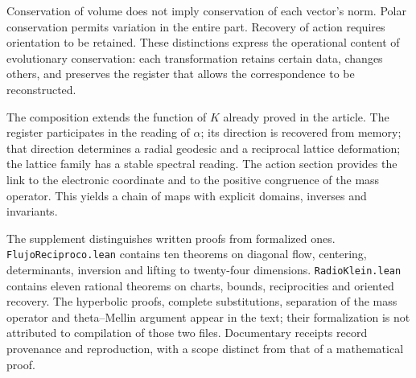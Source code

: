 Conservation of volume does not imply conservation of each vector's norm. Polar conservation permits variation in the entire part. Recovery of action requires orientation to be retained. These distinctions express the operational content of evolutionary conservation: each transformation retains certain data, changes others, and preserves the register that allows the correspondence to be reconstructed.

The composition extends the function of \(K\) already proved in the article. The register participates in the reading of \(\alpha\); its direction is recovered from memory; that direction determines a radial geodesic and a reciprocal lattice deformation; the lattice family has a stable spectral reading. The action section provides the link to the electronic coordinate and to the positive congruence of the mass operator. This yields a chain of maps with explicit domains, inverses and invariants.

The supplement distinguishes written proofs from formalized ones. \texttt{FlujoReciproco.lean} contains ten theorems on diagonal flow, centering, determinants, inversion and lifting to twenty-four dimensions. \texttt{RadioKlein.lean} contains eleven rational theorems on charts, bounds, reciprocities and oriented recovery. The hyperbolic proofs, complete substitutions, separation of the mass operator and theta--Mellin argument appear in the text; their formalization is not attributed to compilation of those two files. Documentary receipts record provenance and reproduction, with a scope distinct from that of a mathematical proof.
